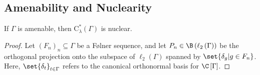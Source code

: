\subsection{Amenability and Nuclearity}%
\begin{theorem}
  If $\Gamma$ is amenable, then $\mathrm{C}^{\ast}_{\lambda}\left( \Gamma \right)$ is nuclear.
\end{theorem}
\begin{proof}
  Let $\left( F_n \right)_n\subseteq \Gamma$ be a Følner sequence, and let $P_n\in \B\left( \ell_2\left( \Gamma \right) \right)$ be the orthogonal projection onto the subspace of $\ell_2\left( \Gamma \right)$ spanned by $\set{\delta_g | g\in F_n}$. Here, $\set{\delta_t}_{t\in\Gamma}$ refers to the canonical orthonormal basis for $\C\left[ \Gamma \right]$.\newline


\end{proof}
